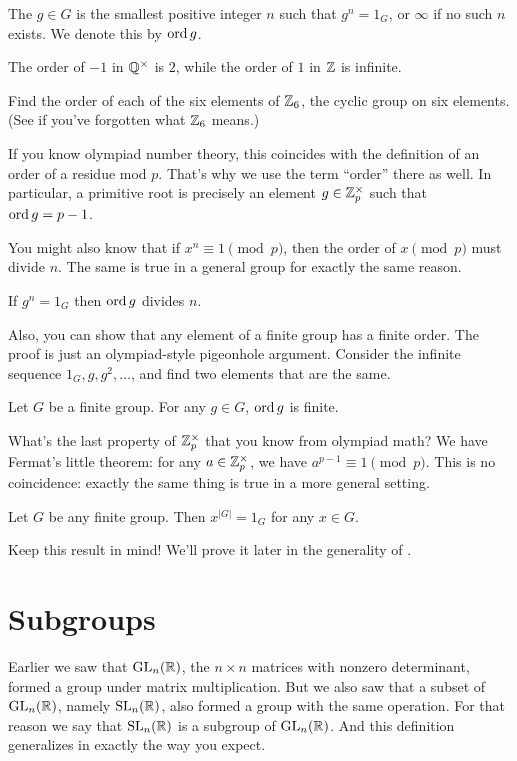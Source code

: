 \begin{definition}
	The  $g \in G$ is the smallest positive integer $n$
	such that $g^n = 1_G$, or $\infty$ if no such $n$ exists.
	We denote this by $\operatorname{ord} g$.
\end{definition}
\begin{example}
	The order of $-1$ in $\mathbb Q^\times$ is $2$,
	while the order of $1$ in $\mathbb Z$ is infinite.
\end{example}
\begin{ques}
	Find the order of each of the six elements of $\mathbb Z_{6}$,
	the cyclic group on six elements.
	(See  if you've forgotten what $\mathbb Z_{6}$ means.)
\end{ques}
\begin{example}
	If you know olympiad number theory, this coincides with the definition of an order of a residue mod $p$.
	That's why we use the term ``order'' there as well.
	In particular, a primitive root is precisely an element $g \in \mathbb Z_{p}^\times$
	such that $\operatorname{ord} g = p-1$.
\end{example}
You might also know that if $x^n \equiv 1 \pmod p$,
then the order of $x \pmod p$ must divide $n$.
The same is true in a general group for exactly the same reason.
\begin{fact}
	If $g^n = 1_G$ then $\operatorname{ord} g$ divides $n$.
\end{fact}
Also, you can show that any element
of a finite group has a finite order.
The proof is just an olympiad-style pigeonhole argument.
Consider the infinite sequence $1_G, g, g^2, \dots$,
and find two elements that are the same.
\begin{fact}
	Let $G$ be a finite group.
	For any $g \in G$, $\operatorname{ord} g$ is finite.
\end{fact}

What's the last property of $\mathbb Z_{p}^\times$ that you know from olympiad math?
We have Fermat's little theorem: for any $a \in \mathbb Z_{p}^\times$,
we have $a^{p-1} \equiv 1 \pmod p$.
This is no coincidence:
exactly the same thing is true in a more general setting.

\begin{theorem}
	Let $G$ be any finite group.
	Then $x^{\left\lvert G \right\rvert} = 1_G$ for any $x \in G$.
\end{theorem}
Keep this result in mind! We'll prove it later in
the generality of .

\section{Subgroups}
Earlier we saw that $\operatorname{GL}_n(\mathbb R)$, the $n \times n$ matrices with nonzero determinant, formed a group under matrix multiplication.
But we also saw that a subset of $\operatorname{GL}_n(\mathbb R)$, namely $\operatorname{SL}_n(\mathbb R)$, also formed a group with the same operation.
For that reason we say that $\operatorname{SL}_n(\mathbb R)$ is a subgroup of $\operatorname{GL}_n(\mathbb R)$.
And this definition generalizes in exactly the way you expect.

